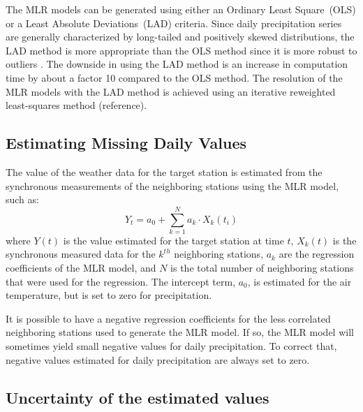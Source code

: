 \documentclass[TechnicalNoteMeteo.tex]{subfiles}
\begin{document}
The MLR models can be generated using either an Ordinary Least Square~(OLS) or a Least Absolute Deviations~(LAD) criteria. Since daily precipitation series are generally characterized by long-tailed and positively skewed distributions, the LAD method is more appropriate than the OLS method since it is more robust to outliers \citep{menke_geophysical_1989,eischeid_creating_2000}. The downside in using the LAD method is an increase in computation time by about a factor 10 compared to the OLS method. The resolution of the MLR models with the LAD method is achieved using an iterative reweighted least-squares method (reference).


\subsection{Estimating Missing Daily Values}\label{sec:est_miss_values}

The value of the weather data for the target station is estimated from the synchronous measurements of the neighboring stations using the MLR model, such as:
%
\begin{equation}
    Y_{t} = a_0 + \sum_{k=1}^{N} a_k \cdot X_k(t_i)
\end{equation}
%
where $Y(t)$ is the value estimated for the target station at time $t$, $X_k(t)$ is the synchronous measured data for the $k^{th}$ neighboring stations, $a_k$ are the regression coefficients of the MLR model, and $N$ is the total number of neighboring stations that were used for the regression. The intercept term, $a_0$, is estimated for the air temperature, but is set to zero for precipitation. 

It is possible to have a negative regression coefficients for the less correlated neighboring stations used to generate the MLR model. If so, the MLR model will sometimes yield small negative values for daily precipitation. To correct that, negative values estimated for daily precipitation are always set to zero.

\subsection{Uncertainty of the estimated values}\label{subsec:crossval}
\end{document}
